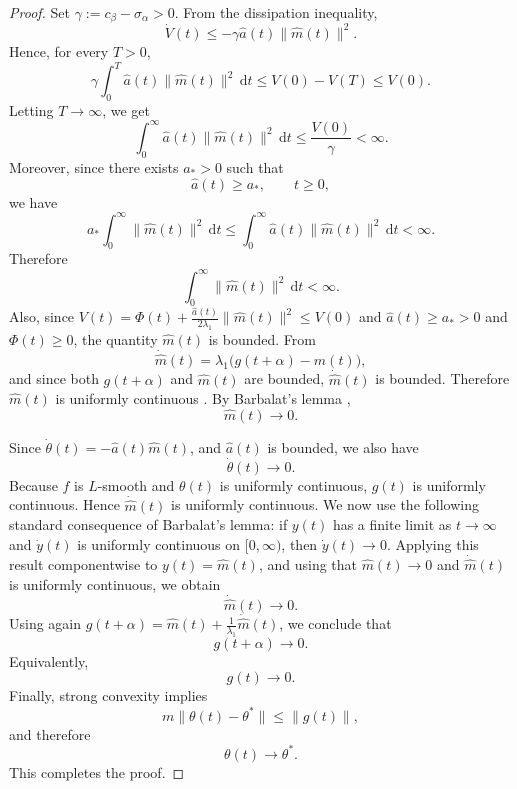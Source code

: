 \documentclass{article} %
\begin{document}
\begin{proof}
Set $\gamma:=c_\beta-\sigma_\alpha>0$. From the dissipation inequality,
\[
    \dot V(t)
    \leq
    -\gamma \widehat a(t)\|\widehat m(t)\|^2.
\]
Hence, for every \(T>0\),
\[
    \gamma
    \int_0^T
    \widehat a(t)\|\widehat m(t)\|^2\,\mathrm dt
    \leq
    V(0)-V(T) \leq V(0).
\]
Letting \(T\to\infty\), we get
\[
    \int_0^\infty
    \widehat a(t)\|\widehat m(t)\|^2\,\mathrm dt
    \leq
    \frac{V(0)}{\gamma}
    <\infty.
\]
Moreover, since there exists \(a_*>0\) such that
\[
    \widehat a(t)\geq a_*,
    \qquad t\geq0,
\]
we have
\[
    a_*
    \int_0^\infty
    \|\widehat m(t)\|^2\,\mathrm dt
    \leq
    \int_0^\infty
    \widehat a(t)\|\widehat m(t)\|^2\,\mathrm dt
    <\infty.
\]
Therefore
\[
    \int_0^\infty
    \|\widehat m(t)\|^2\,\mathrm dt
    <\infty.
\]
Also, since \(V(t)=\Phi(t)+\frac{\widehat a(t)}{2\lambda_1}\|\widehat m(t)\|^2\leq V(0)\) and \(\widehat a(t)\geq a_*>0\) and $\Phi(t)\geq 0$, the quantity \(\widehat m(t)\) is bounded. From
\[
    \dot{\widehat m}(t)
    =
    \lambda_1\bigl(g(t+\alpha)-\widehat m(t)\bigr),
\]
and since both \(g(t+\alpha)\) and \(\widehat m(t)\) are bounded, \(\dot{\widehat m}(t)\) is bounded. Therefore \(\widehat m(t)\) is uniformly continuous \cite[Theorem 5.10]{Rudin1976}. By Barbalat's lemma  \cite{Barbalat1959},
\[
    \widehat m(t)\to0.
\]

Since $\dot\theta(t) = -\widehat a(t)\widehat m(t)$, and \(\widehat a(t)\) is bounded, we also have
\[
    \dot\theta(t)\to0.
\]
Because \(f\) is \(L\)-smooth and \(\theta(t)\) is uniformly continuous, \(g(t)\) is uniformly continuous. Hence \(\dot{\widehat m}(t)\) is uniformly continuous. We now use the following standard consequence of Barbalat's lemma: if \(y(t)\) has a finite limit as \(t\to\infty\) and \(\dot y(t)\) is uniformly continuous on \([0,\infty)\), then \(\dot y(t)\to0\). Applying this result componentwise to \(y(t)=\widehat m(t)\), and using that \(\widehat m(t)\to0\) and \(\dot{\widehat m}(t)\) is uniformly continuous,
we obtain
\[
    \dot{\widehat m}(t)\to0.
\]
Using again $g(t+\alpha) = \widehat m(t)+\frac1{\lambda_1}\dot{\widehat m}(t)$, we conclude that
\[
    g(t+\alpha)\to0.
\]
Equivalently,
\[
    g(t)\to0.
\]
Finally, strong convexity implies
\[
    m\|\theta(t)-\theta^*\|
    \leq
    \|g(t)\|,
\]
and therefore
\[
    \theta(t)\to\theta^*.
\]
This completes the proof.
\end{proof}
\end{document}
